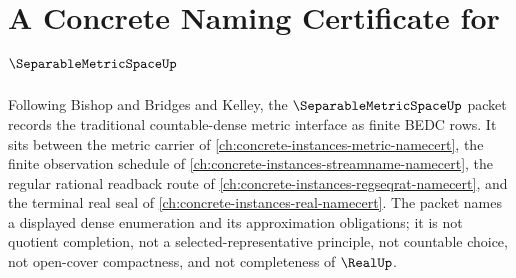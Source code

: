 \chapter{A Concrete Naming Certificate for $\SeparableMetricSpaceUp$}
\label{ch:concrete-instances-separable-metric-space-namecert}

Following Bishop and Bridges and Kelley, the $\SeparableMetricSpaceUp$ packet records the traditional countable-dense metric interface as finite BEDC rows. It sits between the metric carrier of \autoref{ch:concrete-instances-metric-namecert}, the finite observation schedule of \autoref{ch:concrete-instances-streamname-namecert}, the regular rational readback route of \autoref{ch:concrete-instances-regseqrat-namecert}, and the terminal real seal of \autoref{ch:concrete-instances-real-namecert}. The packet names a displayed dense enumeration and its approximation obligations; it is not quotient completion, not a selected-representative principle, not countable choice, not open-cover compactness, and not completeness of $\RealUp$.

